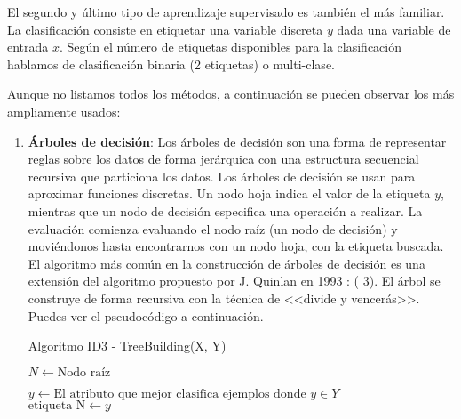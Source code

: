 El segundo y último tipo de aprendizaje supervisado es también el más familiar. La clasificación consiste en etiquetar una variable discreta $y$ dada una variable de entrada $x$. Según el número de etiquetas disponibles para la clasificación hablamos de clasificación binaria (2 etiquetas) o multi-clase.

Aunque no listamos todos los métodos, a continuación se pueden observar los más ampliamente usados:

\begin{enumerate}
  \item \textbf{Árboles de decisión}: Los árboles de decisión son una forma de representar reglas sobre los datos de forma jerárquica con una estructura secuencial recursiva que particiona los datos. Los árboles de decisión se usan para aproximar funciones discretas. Un nodo hoja indica el valor de la etiqueta $y$, mientras que un nodo de decisión especifica una operación a realizar. La evaluación comienza evaluando el nodo raíz (un nodo de decisión) y moviéndonos hasta encontrarnos con un nodo hoja, con la etiqueta buscada. El algoritmo más común en la construcción de árboles de decisión es una extensión del algoritmo propuesto por J. Quinlan en 1993 \et {}:  ( 3). El árbol se construye  de forma recursiva con la técnica de <<divide y vencerás>>. Puedes ver el pseudocódigo a continuación.

        \begin{algorithm}[H]
          \caption{Algoritmo ID3 - TreeBuilding(X, Y)}

          \BlankLine

          \BlankLine

          $N \gets \text{Nodo raíz}$\\

          \BlankLine

          \BlankLine
          $y \gets \text{El atributo que mejor clasifica ejemplos donde } y \in Y$\\
          $\text{etiqueta N} \gets y$\\


\end{algorithm}
\end{enumerate}
